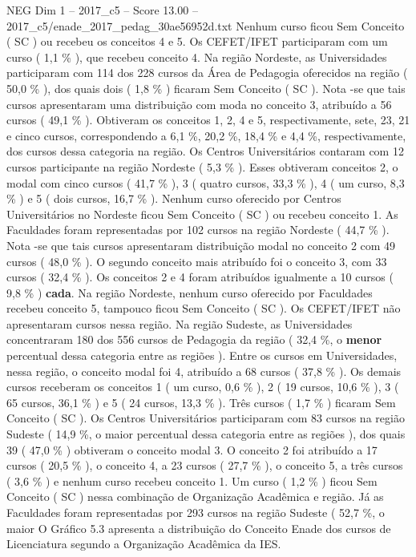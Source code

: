 \begin{textsample}{NEG Dim 1 – 2017\_c5 – Score 13.00 – 2017\_c5/enade\_2017\_pedag\_30ae56952d.txt}
Nenhum curso ficou Sem Conceito ( SC ) ou recebeu os conceitos 4 e 5.
Os CEFET/IFET participaram com um curso ( 1,1 \% ), que recebeu conceito 4.
Na região Nordeste, as Universidades participaram com 114 dos 228 cursos da Área de Pedagogia oferecidos na região ( 50,0 \% ), dos quais dois ( 1,8 \% ) ficaram Sem Conceito ( SC ).
Nota -se que tais cursos apresentaram uma distribuição com moda no conceito 3, atribuído a 56 cursos ( 49,1 \% ).
Obtiveram os conceitos 1, 2, 4 e 5, respectivamente, sete, 23, 21 e cinco cursos, correspondendo a 6,1 \%, 20,2 \%, 18,4 \% e 4,4 \%, respectivamente, dos cursos dessa categoria na região.
Os Centros Universitários contaram com 12 cursos participante na região Nordeste ( 5,3 \% ).
Esses obtiveram conceitos 2, o modal com cinco cursos ( 41,7 \% ), 3 ( quatro cursos, 33,3 \% ), 4 ( um curso, 8,3 \% ) e 5 ( dois cursos, 16,7 \% ).
Nenhum curso oferecido por Centros Universitários no Nordeste ficou Sem Conceito ( SC ) ou recebeu conceito 1.
As Faculdades foram representadas por 102 cursos na região Nordeste ( 44,7 \% ).
Nota -se que tais cursos apresentaram distribuição modal no conceito 2 com 49 cursos ( 48,0 \% ).
O segundo conceito mais atribuído foi o conceito 3, com 33 cursos ( 32,4 \% ).
Os conceitos 2 e 4 foram atribuídos igualmente a 10 cursos ( 9,8 \% ) \textbf{cada}.
Na região Nordeste, nenhum curso oferecido por Faculdades recebeu conceito 5, tampouco ficou Sem Conceito ( SC ).
Os CEFET/IFET não apresentaram cursos nessa região.
Na região Sudeste, as Universidades concentraram 180 dos 556 cursos de Pedagogia da região ( 32,4 \%, o \textbf{menor} percentual dessa categoria entre as regiões ).
Entre os cursos em Universidades, nessa região, o conceito modal foi 4, atribuído a 68 cursos ( 37,8 \% ).
Os demais cursos receberam os conceitos 1 ( um curso, 0,6 \% ), 2 ( 19 cursos, 10,6 \% ), 3 ( 65 cursos, 36,1 \% ) e 5 ( 24 cursos, 13,3 \% ).
Três cursos ( 1,7 \% ) ficaram Sem Conceito ( SC ).
Os Centros Universitários participaram com 83 cursos na região Sudeste ( 14,9 \%, o maior percentual dessa categoria entre as regiões ), dos quais 39 ( 47,0 \% ) obtiveram o conceito modal 3.
O conceito 2 foi atribuído a 17 cursos ( 20,5 \% ), o conceito 4, a 23 cursos ( 27,7 \% ), o conceito 5, a três cursos ( 3,6 \% ) e nenhum curso recebeu conceito 1.
Um curso ( 1,2 \% ) ficou Sem Conceito ( SC ) nessa combinação de Organização Acadêmica e região.
Já as Faculdades foram representadas por 293 cursos na região Sudeste ( 52,7 \%, o maior O Gráfico 5.3 apresenta a distribuição do Conceito Enade dos cursos de Licenciatura segundo a Organização Acadêmica da IES.

\end{textsample}
